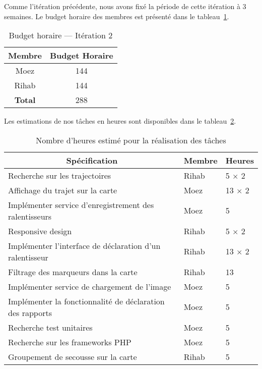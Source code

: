 Comme l'itération précédente, nous avons fixé la période de cette itération à 3
semaines. Le budget horaire des membres est présenté dans le
tableau~\ref{tab:sprint2-capacity}.

\begin{table}[H]
    \centering
    \begin{tabular}{| c | c |}
        \hline
        \textbf{Membre} & \textbf{Budget Horaire} \\ \hline
        \hline
Moez & 144 \\ \hline
Rihab & 144 \\ \hline
\textbf{Total} & 288 \\ \hline
    \end{tabular}
    \caption{Budget horaire --- Itération 2}
\label{tab:sprint2-capacity}
\end{table}

Les estimations de nos tâches en heures sont disponibles dans le
tableau~\ref{tab:sprint2-estimation}.

\begin{table}[H]
    \centering
    \begin{tabular}{| l | l | l |}

        \hline
        \multicolumn{1}{|c}{\textbf{Spécification}} &
        \multicolumn{1}{|c}{\textbf{Membre}} &
        \multicolumn{1}{|c|}{\textbf{Heures}} \\ \hline

        \hline
Recherche sur les trajectoires & Rihab & 5 $\times$ 2 \\ \hline
Affichage du trajet sur la carte & Moez & 13 $\times$ 2 \\ \hline
Implémenter service d'enregistrement des ralentisseurs & Moez & 5 \\ \hline
Responsive design & Rihab & 5 $\times$ 2 \\ \hline
Implémenter l'interface de déclaration d'un ralentisseur & Rihab & 13 $\times$ 2 \\ \hline
Filtrage des marqueurs dans la carte & Rihab & 13 \\ \hline
Implémenter service de chargement de l'image & Moez & 5 \\ \hline
Implémenter la fonctionnalité de déclaration des rapports & Moez & 5 \\ \hline
Recherche test unitaires & Moez & 5 \\ \hline
Recherche sur les frameworks PHP & Moez & 5 \\ \hline
Groupement de secousse sur la carte & Rihab & 5 \\ \hline
    \end{tabular}
    \caption{Nombre d'heures estimé pour la réalisation des tâches}
\label{tab:sprint2-estimation}
\end{table}

